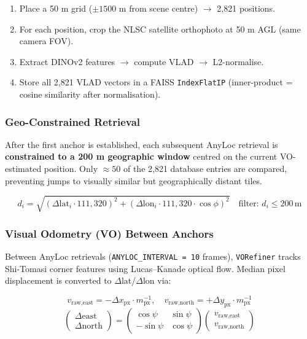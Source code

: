 \documentclass[11pt,a4paper]{article}
\begin{document}
\begin{enumerate}
  \item Place a 50 m grid ($\pm1500$ m from scene centre) \ensuremath{\to} 2,821 positions.
  \item For each position, crop the NLSC satellite orthophoto at 50 m AGL (same camera FOV).
  \item Extract DINOv2 features \ensuremath{\to} compute VLAD \ensuremath{\to} L2-normalise.
  \item Store all 2,821 VLAD vectors in a FAISS \texttt{IndexFlatIP} (inner-product = cosine similarity after normalisation).
\end{enumerate}

\subsubsection*{Geo-Constrained Retrieval}

After the first anchor is established, each subsequent AnyLoc retrieval is
\textbf{constrained to a 200 m geographic window} centred on the current VO-estimated position.
Only $\approx 50$ of the 2,821 database entries are compared, preventing jumps to
visually similar but geographically distant tiles.

\[
  d_i = \sqrt{(\Delta\text{lat}_i \cdot 111{,}320)^2 + (\Delta\text{lon}_i \cdot 111{,}320 \cdot \cos\phi)^2}
  \quad \text{filter: } d_i \leq 200\,\text{m}
\]

\subsubsection*{Visual Odometry (VO) Between Anchors}

Between AnyLoc retrievals (\texttt{ANYLOC\_INTERVAL = 10} frames), \texttt{VORefiner} tracks
Shi-Tomasi corner features using Lucas--Kanade optical flow.  Median pixel displacement
is converted to $\Delta$lat/$\Delta$lon via:

\[
  v_\text{raw,east}  = -\Delta x_\text{px} \cdot m_\text{px}^{-1},
  \quad
  v_\text{raw,north} = +\Delta y_\text{px} \cdot m_\text{px}^{-1}
\]
\[
  \begin{pmatrix}\Delta\text{east}\\\Delta\text{north}\end{pmatrix}
  =
  \begin{pmatrix}\cos\psi & \sin\psi \\ -\sin\psi & \cos\psi\end{pmatrix}
  \begin{pmatrix}v_\text{raw,east}\\v_\text{raw,north}\end{pmatrix}
\]
\end{document}
